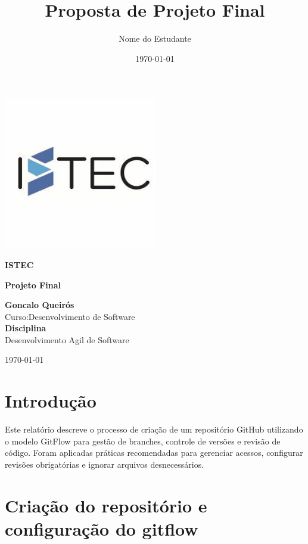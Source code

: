 \documentclass[a4paper,12pt]{article}
\title{\textbf{Proposta de Projeto Final}}
\author{Nome do Estudante}
\date{\today}
\begin{document}
\begin{titlepage}
    \centering
    \includegraphics[width=0.5\textwidth]{istec.jpeg}
    \vspace{1cm}

    {\LARGE \textbf{ISTEC} \par}
    \vspace{1.5cm}

    {\Large \textbf{Projeto Final} \par}
    \vspace{0.5cm}

    \textbf{Goncalo Queirós} \\
    Curso:Desenvolvimento de Software \\

    \textbf{Disciplina} \\
    Desenvolvimento Agil de Software \\

    \vfill

    {\large \today\par}
\end{titlepage}

\newpage
\tableofcontents
\newpage

\section{Introdução}
Este relatório descreve o processo de criação de um repositório GitHub utilizando o modelo GitFlow para gestão de branches, controle de versões e revisão de código. Foram aplicadas práticas recomendadas para gerenciar acessos, configurar revisões obrigatórias e ignorar arquivos desnecessários.

\section{Criação do repositório e configuração do gitflow}
\end{document}
